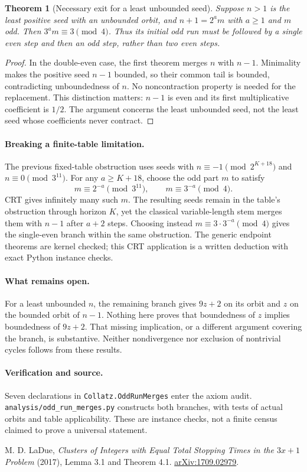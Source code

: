 \documentclass[10pt]{article}
\newtheorem{theorem}{Theorem}
\begin{document}
\begin{theorem}[Necessary exit for a least unbounded seed]
Suppose $n>1$ is the least positive seed with an unbounded orbit, and
$n+1=2^am$ with $a\geq1$ and $m$ odd. Then $3^am\equiv3\pmod4$.
Thus its initial odd run must be followed by a single even step and
then an odd step, rather than two even steps.
\end{theorem}
\begin{proof}
In the double-even case, the first theorem merges $n$ with $n-1$.
Minimality makes the positive seed $n-1$ bounded, so their common tail
is bounded, contradicting unboundedness of $n$.
No noncontraction property is needed for the replacement. This distinction
matters: $n-1$ is even and its first multiplicative coefficient is $1/2$.
The argument concerns the least unbounded seed, not the least seed whose
coefficients never contract.
\end{proof}

\paragraph{Breaking a finite-table limitation.}
The previous fixed-table obstruction uses seeds with
$n\equiv-1\pmod{2^{K+18}}$ and $n\equiv0\pmod{3^{11}}$.
For any $a\geq K+18$, choose the odd part $m$ to satisfy
\[
m\equiv2^{-a}\pmod{3^{11}},\qquad
m\equiv3^{-a}\pmod4.
\]
CRT gives infinitely many such $m$. The resulting seeds remain in the
table's obstruction through horizon $K$, yet the classical variable-length
stem merges them with $n-1$ after $a+2$ steps. Choosing instead
$m\equiv3\cdot3^{-a}\pmod4$ gives the single-even branch within the same
obstruction. The generic endpoint theorems are kernel checked; this CRT
application is a written deduction with exact Python instance checks.

\paragraph{What remains open.}
For a least unbounded $n$, the remaining branch gives $9z+2$ on its orbit
and $z$ on the bounded orbit of $n-1$. Nothing here proves that boundedness
of $z$ implies boundedness of $9z+2$. That missing implication, or a
different argument covering the branch, is substantive. Neither
nondivergence nor exclusion of nontrivial cycles follows from these results.

\paragraph{Verification and source.}
\begingroup\raggedright
Seven declarations in \texttt{Collatz.OddRunMerges} enter the axiom audit.
\texttt{analysis/odd\_run\_merges.py} constructs both branches, with tests
of actual orbits and table applicability. These are instance checks,
not a finite census claimed to prove a universal statement.\par\endgroup

\noindent[1] M. D. LaDue, \emph{Clusters of Integers with Equal Total Stopping
Times in the $3x+1$ Problem} (2017), Lemma 3.1 and Theorem 4.1.
\href{https://arxiv.org/abs/1709.02979}{arXiv:1709.02979}.
\end{document}
